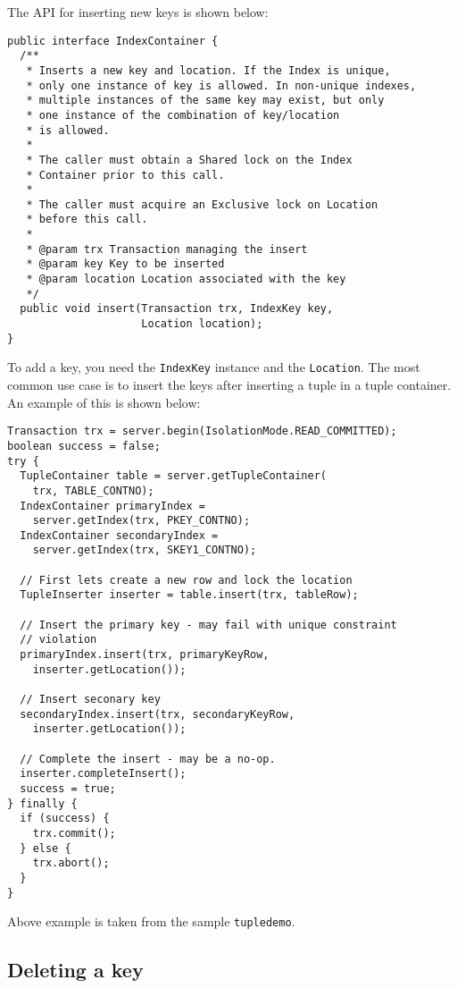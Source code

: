 \documentclass[a4paper,draft,oneside]{book}
\begin{document}
The API for inserting new keys is shown below:

\begin{verbatim}
public interface IndexContainer {
  /**
   * Inserts a new key and location. If the Index is unique, 
   * only one instance of key is allowed. In non-unique indexes, 
   * multiple instances of the same key may exist, but only
   * one instance of the combination of key/location
   * is allowed.
   *
   * The caller must obtain a Shared lock on the Index 
   * Container prior to this call.
   * 
   * The caller must acquire an Exclusive lock on Location 
   * before this call.
   * 
   * @param trx Transaction managing the insert
   * @param key Key to be inserted
   * @param location Location associated with the key
   */
  public void insert(Transaction trx, IndexKey key, 
                     Location location);
}
\end{verbatim}

To add a key, you need the \verb|IndexKey| instance and the
\verb|Location|. The most common use case is to insert the keys
after inserting a tuple in a tuple container. An example of this is
shown below:

\begin{verbatim}
Transaction trx = server.begin(IsolationMode.READ_COMMITTED);
boolean success = false;
try {
  TupleContainer table = server.getTupleContainer(
    trx, TABLE_CONTNO);
  IndexContainer primaryIndex = 
    server.getIndex(trx, PKEY_CONTNO);
  IndexContainer secondaryIndex = 
    server.getIndex(trx, SKEY1_CONTNO);

  // First lets create a new row and lock the location
  TupleInserter inserter = table.insert(trx, tableRow);

  // Insert the primary key - may fail with unique constraint
  // violation
  primaryIndex.insert(trx, primaryKeyRow, 
    inserter.getLocation());
  
  // Insert seconary key
  secondaryIndex.insert(trx, secondaryKeyRow, 
    inserter.getLocation());

  // Complete the insert - may be a no-op.
  inserter.completeInsert();
  success = true;
} finally {
  if (success) {
    trx.commit();
  } else {
    trx.abort();
  }
}
\end{verbatim}

Above example is taken from the sample \verb|tupledemo|. 

\subsection{Deleting a key}
\end{document}
